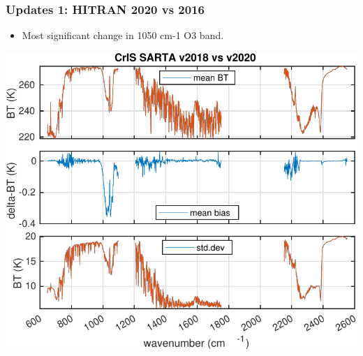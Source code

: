 \documentclass[10pt,t]{beamer}
\begin{document}
\begin{frame}
  \frametitle{Updates 1: HITRAN 2020 vs 2016}
  \begin{itemize}
    \item Most significant change in 1050 cm-1 O3 band.
  \end{itemize}
  
  \begin{center}
    \includegraphics[width=0.75\linewidth]{./Figs/sarta_cris_hr_h2018_vs_h2020_r49_686_mn_stdaslp.pdf}
  \end{center}

\end{frame}
\end{document}
